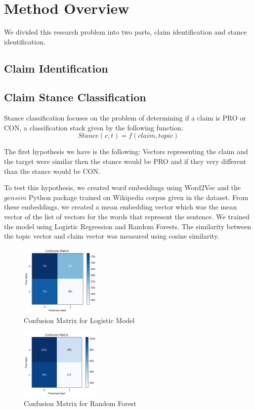 \documentclass[11pt,a4paper]{article}
\begin{document}
\section{Method Overview}
We divided this research problem into two parts, claim identification and stance identification.
\subsection{Claim Identification}
\subsection{Claim Stance Classification}

Stance classification focuses on the problem of determining if a claim is PRO or CON, a classification stack given by the following function:
\begin{equation}
Stance(c, t)=  f(claim, topic)
\end{equation}

The first hypothesis we have is the following:  Vectors representing the claim and the target were similar then the stance would be PRO and if they very different than the stance would be CON.

To test this hypothesis, we created word embeddings using Word2Vec and the $gensim$ Python package trained on Wikipedia corpus given in the dataset.  From these embeddings, we created a mean embedding vector which was the mean vector of the list of vectors for the words that represent the sentence.  We trained the model using Logistic Regression and Random Forests.  The similarity between the topic vector and claim vector was measured using cosine similarity.  

\begin{figure}[H]
    \centering
    \includegraphics[width=0.35\textwidth]{stance_w2v_lr}
    \caption{\label{font-table} Confusion Matrix for Logistic Model }
\end{figure} 

\begin{figure}[H]
    \centering
    \includegraphics[width=0.35\textwidth]{stance_w2v_rf}
    \caption{\label{font-table} Confusion Matrix for Random Forest }
\end{figure} 
\end{document}
